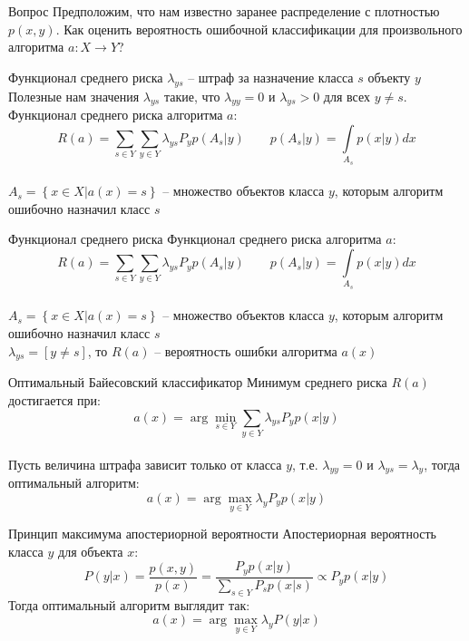 \documentclass[10pt]{beamer}
\begin{document}
\begin{frame}{Вопрос}
  \centering
  Предположим, что нам известно заранее распределение с плотностью $p(x, y)$. Как оценить вероятность ошибочной классификации для произвольного алгоритма $a: X \rightarrow Y$?
\end{frame}

\begin{frame}{Функционал среднего риска}
  $\lambda_{ys}$ -- штраф за назначение класса $s$ объекту $y$\\
  \pause
  \bigbreak
  \alert{Полезные} нам значения $\lambda_{ys}$ такие, что $\lambda_{yy} = 0$ и $\lambda_{ys} > 0$ для всех $y \neq s$.
  \pause
  \bigbreak
  Функционал среднего риска алгоритма $a$:\\
  $$R(a) = \sum\limits_{s \in Y} \sum\limits_{y \in Y} \lambda_{ys} P_y p(A_s|y) \qquad p(A_s|y) = \int\limits_{A_s} p(x|y) dx$$\\
  $A_s = \left\{ x \in X | a(x) = s \right\}$ -- множество объектов класса $y$, которым алгоритм ошибочно назначил класс $s$
\end{frame}

\begin{frame}{Функционал среднего риска}
  Функционал среднего риска алгоритма $a$:\\
  $$R(a) = \sum\limits_{s \in Y} \sum\limits_{y \in Y} \lambda_{ys} P_y p(A_s|y) \qquad p(A_s|y) = \int\limits_{A_s} p(x|y) dx$$\\
  $A_s = \left\{ x \in X | a(x) = s \right\}$ -- множество объектов класса $y$, которым алгоритм ошибочно назначил класс $s$\\
  \bigbreak
  \pause
  $\lambda_{ys} = \left[ y \neq s \right]$, то $R(a)$ -- вероятность ошибки алгоритма $a(x)$
\end{frame}

{
\begin{frame}{Оптимальный Байесовский классификатор}
  Минимум среднего риска $R(a)$ достигается при:\\
  $$a(x) = \arg\min\limits_{s \in Y} \sum \limits_{y \in Y} \lambda_{ys} P_y p(x|y)$$\\
  \bigbreak
  \pause
  Пусть величина штрафа зависит только от класса $y$, т.е. $\lambda_{yy} = 0$ и $\lambda_{ys} = \lambda_y$, тогда оптимальный алгоритм:\\
  $$a(x) = \arg\max\limits_{y \in Y} \lambda_y P_y p(x|y)$$
\end{frame}
}

{
\begin{frame}{Принцип максимума апостериорной вероятности}
  Апостериорная вероятность класса $y$ для объекта $x$:
      $$
    P(y|x)
    = \dfrac{p(x, y)}{p(x)}
    = \dfrac{P_y p(x|y)}{\sum\limits_{s \in Y} P_s p(x|s)}
    \propto P_y p(x|y)
    $$
  \pause
  Тогда оптимальный алгоритм выглядит так:
  $$a(x) = \arg\max\limits_{y \in Y} \lambda_y P(y|x)$$
\end{frame}
}
\end{document}

